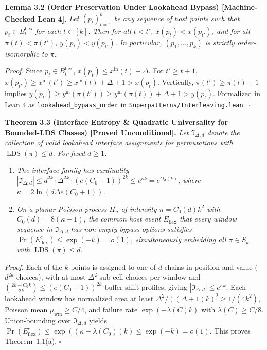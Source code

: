 \documentclass[
  11pt,
]{article}
\providecommand{\tightlist}{%
  \setlength{\itemsep}{0pt}\setlength{\parskip}{0pt}}
\begin{document}
\textbf{Lemma 3.2 (Order Preservation Under Lookahead Bypass) [Machine-Checked Lean 4].}
\emph{Let \((p_t)_{t=1}^k\) be any sequence of host points such that \(p_t \in B_t^{\mathrm{flex}}\) for each \(t \in [k]\). Then for all \(t < t'\), \(x(p_t) < x(p_{t'})\), and for all \(\pi(t) < \pi(t')\), \(y(p_t) < y(p_{t'})\). In particular, \((p_1, \dots, p_k)\) is strictly order-isomorphic to \(\pi\).}

\emph{Proof.} Since \(p_t \in B_t^{\mathrm{flex}}\), \(x(p_t) \le x^{\mathrm{in}}(t) + \Delta\). For \(t' \ge t+1\), \(x(p_{t'}) \ge x^{\mathrm{in}}(t') \ge x^{\mathrm{in}}(t) + \Delta + 1 > x(p_t)\). Vertically, \(\pi(t') \ge \pi(t) + 1\) implies \(y(p_{t'}) \ge y^{\mathrm{in}}(\pi(t')) \ge y^{\mathrm{in}}(\pi(t)) + \Delta + 1 > y(p_t)\). Formalized in Lean 4 as \texttt{lookahead\_bypass\_order} in \texttt{Superpatterns/Interleaving.lean}. \(\square\)

\textbf{Theorem 3.3 (Interface Entropy \& Quadratic Universality for Bounded-LDS Classes) [Proved Unconditional].}
\emph{Let \(\mathfrak{I}_{\Delta, d}\) denote the collection of valid lookahead interface assignments for permutations with \(\operatorname{LDS}(\pi) \le d\). For fixed \(d \ge 1\):}
\begin{enumerate}
\def\labelenumi{\arabic{enumi}.}
\tightlist
\item \emph{The interface family has cardinality \(|\mathfrak{I}_{\Delta, d}| \le d^{2k} \cdot \Delta^{2k} \cdot (e(C_0 + 1))^{2k} \le e^{\kappa k} = e^{O_d(k)}\), where \(\kappa = 2 \ln(d \Delta e (C_0 + 1))\).}
\item \emph{On a planar Poisson process \(\Pi_n\) of intensity \(n = C_0(d) k^2\) with \(C_0(d) = 8(\kappa + 1)\), the common host event \(E_{\mathrm{flex}}\) that every window sequence in \(\mathfrak{I}_{\Delta, d}\) has non-empty bypass options satisfies \(\Pr(E_{\mathrm{flex}}^c) \le \exp(-k) = o(1)\), simultaneously embedding all \(\pi \in S_k\) with \(\operatorname{LDS}(\pi) \le d\).}
\end{enumerate}

\emph{Proof.} Each of the \(k\) points is assigned to one of \(d\) chains in position and value (\(d^{2k}\) choices), with at most \(\Delta^2\) sub-cell choices per window and \(\binom{2k + C_0 k}{2k} \le (e(C_0+1))^{2k}\) buffer shift profiles, giving \(|\mathfrak{I}_{\Delta, d}| \le e^{\kappa k}\). Each lookahead window has normalized area at least \(\Delta^2/((\Delta+1)k)^2 \ge 1/(4k^2)\), Poisson mean \(\mu_{\mathrm{win}} \ge C/4\), and failure rate \(\exp(-\lambda(C)k)\) with \(\lambda(C) \ge C/8\). Union-bounding over \(\mathfrak{I}_{\Delta, d}\) yields \(\Pr(E_{\mathrm{flex}}^c) \le \exp((\kappa - \lambda(C_0))k) \le \exp(-k) = o(1)\). This proves Theorem~1.1(a). \(\square\)
\end{document}
